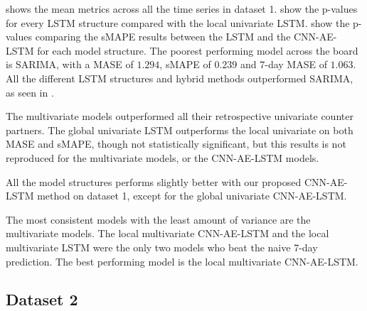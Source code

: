  shows the mean metrics across
all the time series in dataset 1.
 show the p-values
for every LSTM structure compared with the local univariate LSTM.
 show the p-values
comparing the sMAPE results between the LSTM and the CNN-AE-LSTM for each
model structure.
The poorest performing model across the board
is SARIMA, with a MASE of $1.294$, sMAPE of $0.239$ and 7-day MASE of $1.063$.
All the different LSTM structures and hybrid methods outperformed SARIMA,
as seen in .

The multivariate models outperformed all their retrospective univariate counter partners.
The global univariate LSTM outperforms the local univariate on both MASE and sMAPE, though not statistically significant,
but this results is not reproduced for the multivariate models, or the CNN-AE-LSTM models.

All the model structures performs slightly better with our proposed CNN-AE-LSTM method on dataset 1, except for
the global univariate CNN-AE-LSTM.

The most consistent models with the least amount of variance are the multivariate models.
The local multivariate CNN-AE-LSTM and the local multivariate LSTM were the only two models
who beat the naive 7-day prediction. The best performing model is the local multivariate CNN-AE-LSTM.

\subsection{Dataset 2}

